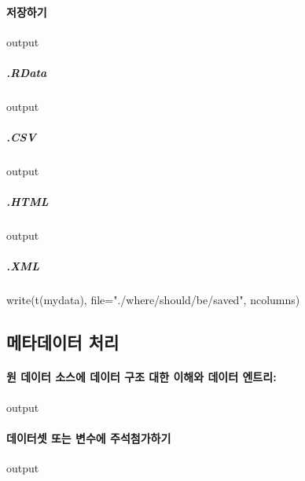 \documentclass{report}
\begin{document}
% 
\paragraph{저장하기}
\begin{Schunk}
\begin{Soutput}
output
\end{Soutput}
\end{Schunk}
\subparagraph{.RData}
\begin{Schunk}
\begin{Soutput}
output
\end{Soutput}
\end{Schunk}
\subparagraph{.CSV}
\begin{Schunk}
\begin{Soutput}
output
\end{Soutput}
\end{Schunk}
\subparagraph{.HTML}
\begin{Schunk}
\begin{Soutput}
output
\end{Soutput}
\end{Schunk}
\subparagraph{.XML}
\begin{Schunk}
\begin{Soutput}
write(t(mydata), file="./where/should/be/saved", ncolumns)
\end{Soutput}
\end{Schunk}

\subsection{메타데이터 처리}
\paragraph{원 데이터 소스에 데이터 구조 대한 이해와 데이터 엔트리: }
\begin{Schunk}
\begin{Soutput}
output
\end{Soutput}
\end{Schunk}

\paragraph{데이터셋 또는 변수에 주석첨가하기}
\begin{Schunk}
\begin{Soutput}
output
\end{Soutput}
\end{Schunk}
\end{document}
